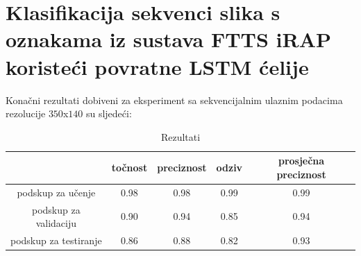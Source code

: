 \documentclass[times, utf8, diplomski, numeric]{fer}
\begin{document}
\section{Klasifikacija sekvenci slika s oznakama iz sustava FTTS iRAP koristeći povratne LSTM ćelije}
Konačni rezultati dobiveni za eksperiment sa sekvencijalnim ulaznim podacima rezolucije $350$x$140$ su sljedeći:

\begin{table}[H]
\centering
\caption{Rezultati}
\label{score:lstm}
\begin{tabular}{c|c|c|c|c|}
\cline{2-5}
                                            & točnost & preciznost & odziv & prosječna preciznost \\ \hline
\multicolumn{1}{|c|}{podskup za učenje}     & 0.98       & 0.98        & 0.99     &           0.99           \\ \hline
\multicolumn{1}{|c|}{podskup za validaciju} & 0.90       & 0.94        & 0.85     &            0.94          \\ \hline
\multicolumn{1}{|c|}{podskup za testiranje} & 0.86       & 0.88        & 0.82     &            0.93          \\ \hline
\end{tabular}
\end{table}
\end{document}
